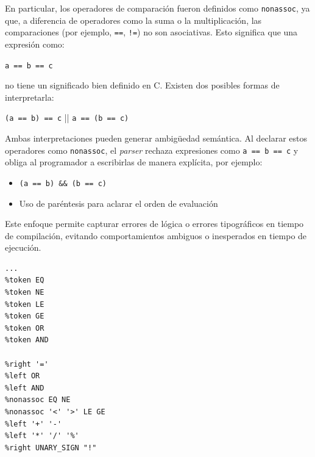 \documentclass[12pt,a4paper]{article}
\begin{document}
\noindent En particular, los operadores de comparación fueron definidos como \texttt{nonassoc}, 
ya que, a diferencia de operadores como la suma o la multiplicación, las comparaciones 
(por ejemplo, \texttt{==}, \texttt{!=}) no son asociativas. Esto significa que una expresión como:
\begin{center}
\texttt{a == b == c}
\end{center}
\noindent
no tiene un significado bien definido en C. Existen dos posibles formas de interpretarla:

\begin{center}
\texttt{(a == b) == c} || \texttt{a == (b == c)}
\end{center}

\noindent Ambas interpretaciones pueden generar ambigüedad semántica. Al declarar estos operadores 
como \texttt{nonassoc}, el \textit{parser} rechaza expresiones como \texttt{a == b == c} y obliga 
al programador a escribirlas de manera explícita, por ejemplo:

\begin{itemize}
    \item \texttt{(a == b) \&\& (b == c)}
    \item Uso de paréntesis para aclarar el orden de evaluación
\end{itemize}

\noindent Este enfoque permite capturar errores de lógica o errores tipográficos en tiempo de 
compilación, evitando comportamientos ambiguos o inesperados en tiempo de ejecución.
\begin{lstlisting}
...
%token EQ
%token NE
%token LE
%token GE
%token OR
%token AND

%right '='                              
%left OR                               
%left AND                               
%nonassoc EQ NE                         
%nonassoc '<' '>' LE GE                 
%left '+' '-'                           
%left '*' '/' '%'                       
%right UNARY_SIGN "!"                   
\end{lstlisting}
\end{document}
